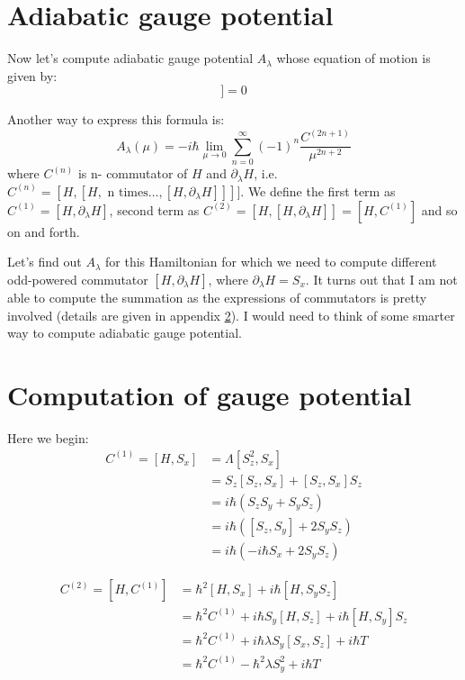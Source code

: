 \documentclass[11pt,a4paper]{article}
\begin{document}
\section{Adiabatic gauge potential}

Now let's compute adiabatic gauge potential $A_{\lambda}$ whose equation of motion is given by:
\begin{equation}
[H, \partial_{\lambda} H +\dfrac{i}{\hbar} [A_{\lambda}, H] ]=0
\end{equation}


Another way to express this formula is:
\begin{equation}
 A_{\lambda}(\mu) =  -i\hbar \lim_{\mu \rightarrow 0} \sum_{n=0}^{\infty}   (-1)^{n} \dfrac{ C^{(2n+1)}}{\mu^{2n+2}}
\end{equation}
where $C^{(n)}$ is n- commutator of $H$ and $\partial_{\lambda} H$, i.e. $C^{(n)}= [H, [H, \mbox{ n times} \ldots,[H, \partial_{\lambda} H ]]] ] $.  We define the first term as $C^{(1)}= [H, \partial_{\lambda}H]$, second term as $C^{(2)}= [H,[H, \partial_{\lambda}H]]= [H, C^{(1)}]$ and so on and forth.

Let's find out $A_{\lambda}$ for this Hamiltonian for which we need to compute different odd-powered commutator $[H, \partial_{\lambda} H]$, where $\partial_{\lambda} H=S_x$. It turns out that I am not able to compute the summation as the expressions of commutators is pretty involved (details are given in appendix \ref{sec.potn}). I would need to think of some smarter way to compute adiabatic gauge potential.


\appendix

\section{Computation of gauge potential}\label{sec.potn}

Here we begin:
\begin{align*}
C^{(1)}=[H,S_x] &= \Lambda  [S_z^2, S_x] \\
&= S_z[S_z, S_x] + [S_z, S_x] S_z \\
&= i \hbar (S_z S_y + S_y S_z) \\
&=i \hbar ([S_z, S_y] +  2 S_y S_z)\\
&=i \hbar (- i \hbar S_x +  2 S_y S_z)
\end{align*}

\begin{align*}
C^{(2)}=[H,C^{(1)}] &=     \hbar^2 [H,  S_x]  +  i \hbar[ H,   S_y S_z] \\
&= \hbar^2 C^{(1)}  +  i \hbar S_y[ H,    S_z] +  i \hbar[ H,   S_y ]S_z\\
&= \hbar^2 C^{(1)}  +  i \hbar \lambda S_y [ S_x,    S_z] + i \hbar T\\
&= \hbar^2 C^{(1)} - \hbar^2 \lambda S_y^2  + i \hbar T
\end{align*}
\end{document}

